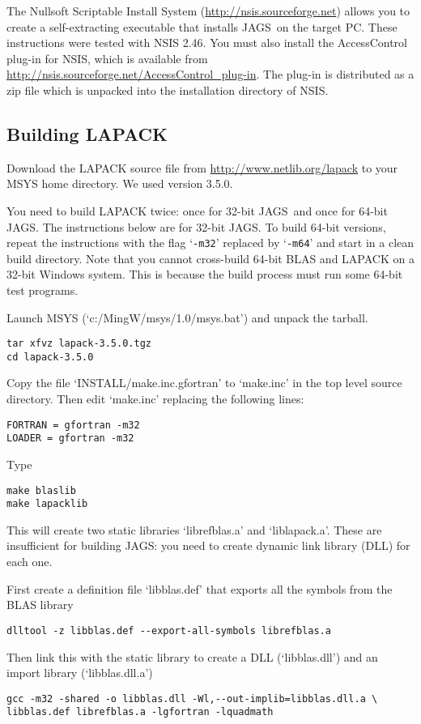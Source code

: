 \documentclass[11pt, a4paper, titlepage]{article}
\newcommand{\JAGS}{\textsf{JAGS}}
\newcommand{\samp}[1]{{`\bgroup\normalfont\texttt{#1}'\egroup}}
\newcommand{\file}[1]{{`\normalfont\textsf{#1}'}}
\let\option=\samp
\begin{document}
The Nullsoft Scriptable Install System
(\url{http://nsis.sourceforge.net}) allows you to create a
self-extracting executable that installs \JAGS\ on the target PC.
These instructions were tested with NSIS 2.46.  You must also install
the AccessControl plug-in for NSIS, which is available from
\url{http://nsis.sourceforge.net/AccessControl_plug-in}. The plug-in
is distributed as a zip file which is unpacked into the installation
directory of NSIS.

\subsection{Building LAPACK}

Download the LAPACK source file from
\url{http://www.netlib.org/lapack} to your MSYS home directory. We
used version 3.5.0.

You need to build LAPACK twice: once for 32-bit \JAGS\ and once for
64-bit \JAGS. The instructions below are for 32-bit \JAGS. To build
64-bit versions, repeat the instructions with the flag \option{-m32}
replaced by \option{-m64} and start in a clean build directory.  Note
that you cannot cross-build 64-bit BLAS and LAPACK on a 32-bit Windows
system. This is because the build process must run some 64-bit test
programs.

Launch MSYS (\file{c:/MingW/msys/1.0/msys.bat}) and unpack the tarball.
\begin{verbatim}
tar xfvz lapack-3.5.0.tgz
cd lapack-3.5.0
\end{verbatim}
Copy the file \file{INSTALL/make.inc.gfortran} to \file{make.inc} in
the top level source directory.  Then edit \file{make.inc} replacing
the following lines:
\begin{verbatim}
FORTRAN = gfortran -m32
LOADER = gfortran -m32
\end{verbatim}
Type
\begin{verbatim}
make blaslib
make lapacklib 
\end{verbatim}
This will create two static libraries \file{librefblas.a} and
\file{liblapack.a}. These are insufficient for building \JAGS: you
need to create dynamic link library (DLL) for each one.

First create a definition file \file{libblas.def} that exports all the
symbols from the BLAS library
\begin{verbatim}
dlltool -z libblas.def --export-all-symbols librefblas.a
\end{verbatim}
Then link this with the static library to create a DLL
(\file{libblas.dll}) and an import library (\file{libblas.dll.a})
\begin{verbatim}
gcc -m32 -shared -o libblas.dll -Wl,--out-implib=libblas.dll.a \
libblas.def librefblas.a -lgfortran -lquadmath
\end{verbatim}
 
\end{document}
